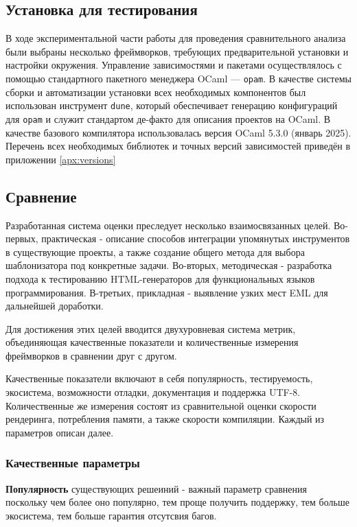 \subsection{Установка для тестирования}

В ходе экспериментальной части работы для проведения сравнительного анализа были выбраны несколько фреймворков, требующих предварительной установки и настройки окружения.
Управление зависимостями и пакетами осуществлялось с помощью стандартного пакетного менеджера OCaml — \texttt{opam}.
В качестве системы сборки и автоматизации установки всех необходимых компонентов был использован инструмент \texttt{dune}, который обеспечивает генерацию конфигураций для \texttt{opam} и служит стандартом де-факто для описания проектов на OCaml.
В качестве базового компилятора использовалась версия OCaml 5.3.0 (январь 2025).
Перечень всех необходимых библиотек и точных версий зависимостей приведён в приложении \ref{apx:versions}

\subsection{Сравнение}

Разработанная система оценки преследует несколько взаимосвязанных целей.
Во-первых, практическая - описание способов интеграции упомянутых инструментов в существующие проекты, а также создание общего метода для выбора шаблонизатора под конкретные задачи.
Во-вторых, методическая - разработка подхода к тестированию HTML-генераторов для функциональных языков программирования.
В-третьих, прикладная - выявление узких мест EML для дальнейшей доработки.

Для достижения этих целей вводится двухуровневая система метрик, объединяющая качественные показатели и количественные измерения фреймворков в сравнении друг с другом.

Качественные показатели включают в себя популярность, тестируемость, экосистема, возможности отладки, документация и поддержка UTF-8.
Количественные же измерения состоят из сравнительной оценки скорости рендеринга, потребления памяти, а также скорости компиляции.
Каждый из параметров описан далее.

\subsubsection{Качественные параметры}

\textbf{Популярность} существующих решеиний - важный параметр сравнения поскольку чем более оно популярно, тем проще получить поддержку, тем больше экосистема, тем больше гарантия отсутсвия багов.

